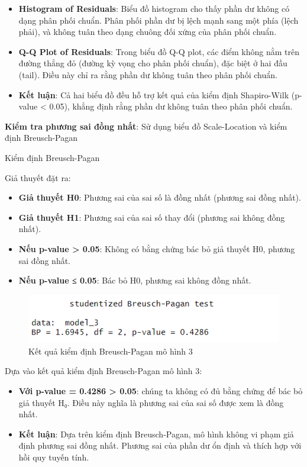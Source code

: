 \begin{itemize}
  \item\textbf{Histogram of Residuals}: Biểu đồ histogram cho thấy phần dư không có dạng phân phối chuẩn. Phân phối phần dư bị lệch mạnh sang một phía (lệch phải), và không tuân theo dạng chuông đối xứng của phân phối chuẩn.
  \item\textbf{Q-Q Plot of Residuals}: Trong biểu đồ Q-Q plot, các điểm không nằm trên đường thẳng đỏ (đường kỳ vọng cho phân phối chuẩn), đặc biệt ở hai đầu (tail). Điều này chỉ ra rằng phần dư không tuân theo phân phối chuẩn.
  \item\textbf{Kết luận}: Cả hai biểu đồ đều hỗ trợ kết quả của kiểm định Shapiro-Wilk (p-value < 0.05), khẳng định rằng phần dư không tuân theo phân phối chuẩn.
\end{itemize}

\textbf{Kiểm tra phương sai đồng nhất}: Sử dụng biểu đồ Scale-Location và kiểm định Breusch-Pagan

Kiểm định Breusch-Pagan

Giả thuyết đặt ra:
\begin{itemize}
  \item\textbf{Giả thuyết H0}: Phương sai của sai số là đồng nhất (phương sai đồng nhất).
  \item\textbf{Giả thuyết H1}: Phương sai của sai số thay đổi (phương sai không đồng nhất).
  \item\textbf{Nếu p-value > 0.05}: Không có bằng chứng bác bỏ giả thuyết H0, phương sai đồng nhất.
  \item\textbf{Nếu p-value ≤ 0.05}: Bác bỏ H0, phương sai không đồng nhất.
\end{itemize}

\begin{figure}[!htp]
  \centering
  \includegraphics[width=0.5\linewidth]{graphics/5.5.10.png}
  \caption{Kết quả kiểm định Breusch-Pagan mô hình 3 }
\end{figure}

Dựa vào kết quả kiểm định Breusch-Pagan mô hình 3:
\begin{itemize}
\item\textbf{Với p-value = 0.4286 > 0.05}: chúng ta không có đủ bằng chứng để bác bỏ giả thuyết H₀. Điều này nghĩa là phương sai của sai số được xem là đồng nhất.
\item\textbf{Kết luận}: Dựa trên kiểm định Breusch-Pagan, mô hình không vi phạm giả định phương sai đồng nhất. Phương sai của phần dư ổn định và thích hợp với hồi quy tuyến tính.
\end{itemize}

